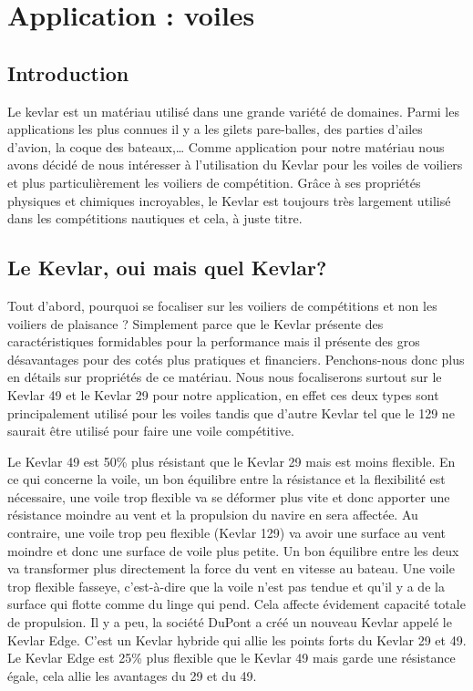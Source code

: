 \chapter{Application : voiles}

\begin{multicols}{2}
\section{Introduction}
   Le kevlar est un matériau utilisé dans une grande variété de domaines.  Parmi les applications les plus connues il y a les gilets pare-balles, des parties d’ailes d’avion, la coque des bateaux,…  Comme application pour notre matériau nous avons décidé de nous intéresser à l’utilisation du Kevlar pour les voiles de voiliers et plus particulièrement les voiliers de compétition.  Grâce à ses propriétés physiques et chimiques incroyables, le Kevlar est toujours très largement utilisé dans les compétitions nautiques et cela, à juste titre.

\section{Le Kevlar, oui mais quel Kevlar?}
Tout d’abord, pourquoi se focaliser sur les voiliers de compétitions et non les voiliers de plaisance ?  Simplement parce que le Kevlar présente des caractéristiques formidables pour la performance mais il présente des gros désavantages pour des cotés plus pratiques et financiers.  Penchons-nous donc plus en détails sur propriétés de ce matériau.  Nous nous focaliserons surtout sur le Kevlar 49 et le Kevlar 29 pour notre application, en effet ces deux types sont principalement utilisé pour les voiles tandis que d’autre Kevlar tel que le 129 ne saurait être utilisé pour faire une voile compétitive.

Le Kevlar 49 est 50\% plus résistant que le Kevlar 29 mais est moins flexible.  En ce qui concerne la voile, un bon équilibre entre la résistance et la flexibilité est nécessaire, une voile trop flexible va se déformer plus vite et donc apporter une résistance moindre au vent et la propulsion du navire en sera affectée.  Au contraire, une voile trop peu flexible (Kevlar 129) va avoir une surface au vent moindre et donc une surface de voile plus petite.  Un bon équilibre entre les deux  va transformer plus directement la force du vent en vitesse au bateau.   Une voile trop flexible fasseye, c’est-à-dire que la voile n’est pas tendue et qu’il y a de la surface qui flotte comme du linge qui pend.  Cela affecte évidement capacité totale de propulsion.  Il y a peu, la société DuPont a créé un nouveau Kevlar appelé le Kevlar Edge.  C’est un Kevlar hybride qui allie les points forts du Kevlar 29 et 49.  Le Kevlar Edge est 25\% plus flexible que le Kevlar 49 mais garde une résistance égale,  cela allie les avantages du 29 et du 49. 


\end{multicols}
